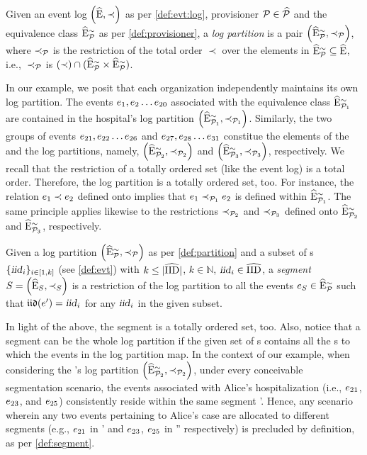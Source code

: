 \begin{newj}
\begin{definition}\label{def:partition}
	Given an event log $\left( \widehat{\mathrm{E}}, \prec \right)$ as per \cref{def:evt:log}, provisioner $\mathcal{P} \in \widehat{\mathcal{P}}$ and the equivalence class $\widehat{\mathrm{E}}^{\sim}_{\mathcal{P}}$ as per \cref{def:provisioner}, a \emph{log partition} is a pair $\left( \widehat{\mathrm{E}}^{\sim}_{\mathcal{P}}, \prec_{\mathcal{P}} \right)$, where $\prec_{\mathcal{P}}$ is the restriction of the total order $\prec$ over the elements in $\widehat{\mathrm{E}}^{\sim}_{\mathcal{P}} \subseteq \widehat{\mathrm{E}}$, i.e., $\;\prec_{\mathcal{P}}$ is $(\prec) \cap (\widehat{\mathrm{E}}^{\sim}_{\mathcal{P}} \times \widehat{\mathrm{E}}^{\sim}_{\mathcal{P}})$.
\end{definition}
%
In our example, we posit that each organization independently maintains its own log partition. The events  $e_{1}, e_{2} \ldots e_{20}$ associated with the equivalence class $\widehat{\mathrm{E}}^{\sim}_{\mathcal{P}_{1}}$ are contained in the hospital's log partition  $\left( \widehat{\mathrm{E}}^{\sim}_{\mathcal{P}_{1}}, \prec_{\mathcal{P}_{1}} \right)$. Similarly, the two groups of events $e_{21}, e_{22} \ldots e_{26}$ and $e_{27}, e_{28} \ldots e_{31}$ constitue the elements of the  and the   log partitions, namely,  $\left( \widehat{\mathrm{E}}^{\sim}_{\mathcal{P}_{2}}, \prec_{\mathcal{P}_{2}} \right)$ and  $\left( \widehat{\mathrm{E}}^{\sim}_{\mathcal{P}_{3}}, \prec_{\mathcal{P}_{3}} \right)$, respectively. We recall that the restriction of a totally ordered set (like the event log) is a total order. Therefore, the log partition is a totally ordered set, too. For instance, the relation $e_1 \prec e_2$ defined onto {\EvtU} implies that $e_1 \prec_{\mathcal{P}_{1}} e_2$ is defined within $\widehat{\mathrm{E}}^{\sim}_{\mathcal{P}_{1}}$. The same principle applies likewise to the restrictions $\prec_{\mathcal{P}_{2}}$ and $\prec_{\mathcal{P}_{3}}$ defined onto $\widehat{\mathrm{E}}^{\sim}_{\mathcal{P}_{2}}$ and $\widehat{\mathrm{E}}^{\sim}_{\mathcal{P}_{3}}$, respectively.

\begin{definition}[Segment]\label{def:segment}
	Given a log partition $\left( \widehat{\mathrm{E}}^{\sim}_{\mathcal{P}}, \prec_{\mathcal{P}} \right)$ as per \cref{def:partition} and a subset of {\CId}s $\{\textrm{\textsl{iid}}_i\}_{i \in [1,k]}$ (see \cref{def:evt}) with $k \leq |\widehat{\mathrm{IID}}|$, $k \in \mathbb{N}$, $\textrm{\textsl{iid}}_i \in \widehat{\mathrm{IID}}$, a \emph{segment} $S = \left( \widehat{\mathrm{E}}_{S}, \prec_{S} \right)$ is a restriction of the log partition to all the events $e_{S} \in \widehat{\mathrm{E}}^{\sim}_{\mathcal{P}}$ such that $\mathfrak{iid}(e') = \textrm{\textsl{iid}}_i$ for any $\textrm{\textsl{iid}}_i$ in the given subset. 
\end{definition}
%
In light of the above, the segment is a totally ordered set, too. Also, notice that a segment can be the whole log partition if the given set of {\CId}s contains all the {\CId}s to which the events in the log partition map. In the context of our example, when considering the 's log partition $\left( \widehat{\mathrm{E}}^{\sim}_{\mathcal{P}_{2}}, \prec_{\mathcal{P}_{2}} \right)$, under every conceivable segmentation scenario, the events associated with Alice's hospitalization (i.e., $e_{21}$, $e_{23}$, and $e_{25}$) consistently reside within the same segment \Segm'. Hence, any scenario wherein any two events pertaining to Alice's case are allocated to different segments (e.g., $e_{21}$ in \Segm' and $e_{23}$, $e_{25}$ in \Segm'' respectively) is precluded by definition, as per \cref{def:segment}.   



\end{newj}
